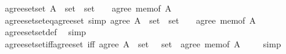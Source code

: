 \begin{isabellebody}
\ {\isachardoublequoteopen}{\isacharparenleft}{\kern0pt}agree{\isacharunderscore}{\kern0pt}set{\isacharunderscore}{\kern0pt}set\ {\isacharparenleft}{\kern0pt}A\ {\isacharcolon}{\kern0pt}{\isacharcolon}{\kern0pt}\ set{\isacharparenright}{\kern0pt}\ {\isacharcolon}{\kern0pt}{\isacharcolon}{\kern0pt}\ set\ {\isasymRightarrow}\ {\isacharunderscore}{\kern0pt}{\isacharparenright}{\kern0pt}\ {\isasymequiv}\ agree\ {\isacharparenleft}{\kern0pt}mem{\isacharunderscore}{\kern0pt}of\ A{\isacharparenright}{\kern0pt}{\isachardoublequoteclose}\isanewline
{}\isamarkupfalse%
\isanewline
\isanewline
{}\isamarkupfalse%
\ agree{\isacharunderscore}{\kern0pt}set{\isacharunderscore}{\kern0pt}set{\isacharunderscore}{\kern0pt}eq{\isacharunderscore}{\kern0pt}agree{\isacharunderscore}{\kern0pt}set\ {\isacharbrackleft}{\kern0pt}simp{\isacharbrackright}{\kern0pt}{\isacharcolon}{\kern0pt}\ {\isachardoublequoteopen}{\isacharparenleft}{\kern0pt}agree\ {\isacharparenleft}{\kern0pt}A\ {\isacharcolon}{\kern0pt}{\isacharcolon}{\kern0pt}\ set{\isacharparenright}{\kern0pt}\ {\isacharcolon}{\kern0pt}{\isacharcolon}{\kern0pt}\ set\ {\isasymRightarrow}\ {\isacharunderscore}{\kern0pt}{\isacharparenright}{\kern0pt}\ {\isacharequal}{\kern0pt}\ agree\ {\isacharparenleft}{\kern0pt}mem{\isacharunderscore}{\kern0pt}of\ A{\isacharparenright}{\kern0pt}{\isachardoublequoteclose}\isanewline
%
\isadelimproof
\ \ %
\endisadelimproof
%
\isatagproof
{}\isamarkupfalse%
\ agree{\isacharunderscore}{\kern0pt}set{\isacharunderscore}{\kern0pt}set{\isacharunderscore}{\kern0pt}def\ \isamarkupfalse%
\ simp%
\endisatagproof
{\isafoldproof}%
%
\isadelimproof
\isanewline
%
\endisadelimproof
\isanewline
{}\isamarkupfalse%
\ agree{\isacharunderscore}{\kern0pt}set{\isacharunderscore}{\kern0pt}set{\isacharunderscore}{\kern0pt}iff{\isacharunderscore}{\kern0pt}agree{\isacharunderscore}{\kern0pt}set\ {\isacharbrackleft}{\kern0pt}iff{\isacharbrackright}{\kern0pt}{\isacharcolon}{\kern0pt}\ {\isachardoublequoteopen}agree\ {\isacharparenleft}{\kern0pt}A\ {\isacharcolon}{\kern0pt}{\isacharcolon}{\kern0pt}\ set{\isacharparenright}{\kern0pt}\ {\isacharparenleft}{\kern0pt}{\isasymR}\ {\isacharcolon}{\kern0pt}{\isacharcolon}{\kern0pt}\ set{\isacharparenright}{\kern0pt}\ {\isasymlongleftrightarrow}\ agree\ {\isacharparenleft}{\kern0pt}mem{\isacharunderscore}{\kern0pt}of\ A{\isacharparenright}{\kern0pt}\ {\isasymR}{\isachardoublequoteclose}\isanewline
%
\isadelimproof
\ \ %
\endisadelimproof
%
\isatagproof
{}\isamarkupfalse%
\ simp%
\endisatagproof

\end{isabellebody}
